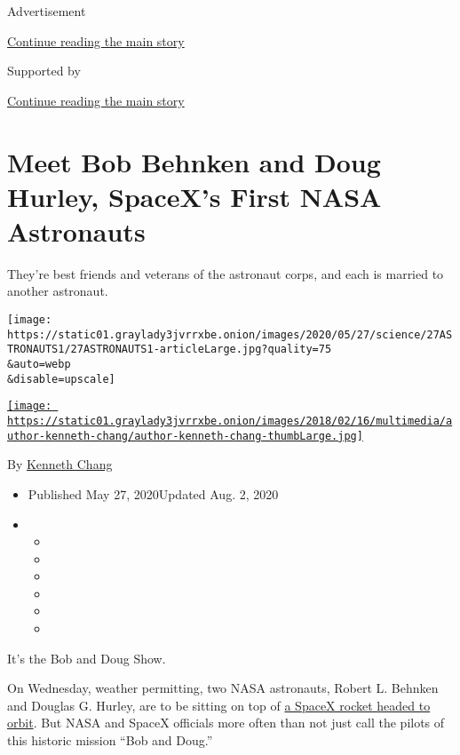 Advertisement

\protect\hyperlink{after-top}{Continue reading the main story}

Supported by

\protect\hyperlink{after-sponsor}{Continue reading the main story}

\hypertarget{meet-bob-behnken-and-doug-hurley-spacexs-first-nasa-astronauts}{%
\section{Meet Bob Behnken and Doug Hurley, SpaceX's First NASA
Astronauts}\label{meet-bob-behnken-and-doug-hurley-spacexs-first-nasa-astronauts}}

They're best friends and veterans of the astronaut corps, and each is
married to another astronaut.

\texttt{[image: https://static01.graylady3jvrrxbe.onion/images/2020/05/27/science/27ASTRONAUTS1/27ASTRONAUTS1-articleLarge.jpg?quality=75\\\&auto=webp\\\&disable=upscale]}

\href{https://www.nytimes3xbfgragh.onion/by/kenneth-chang}{\texttt{[image: https://static01.graylady3jvrrxbe.onion/images/2018/02/16/multimedia/author-kenneth-chang/author-kenneth-chang-thumbLarge.jpg]}}

By \href{https://www.nytimes3xbfgragh.onion/by/kenneth-chang}{Kenneth
Chang}

\begin{itemize}
\item
  Published May 27, 2020Updated Aug. 2, 2020
\item
  \begin{itemize}
  \item
  \item
  \item
  \item
  \item
  \item
  \end{itemize}
\end{itemize}

It's the Bob and Doug Show.

On Wednesday, weather permitting, two NASA astronauts, Robert L. Behnken
and Douglas G. Hurley, are to be sitting on top of
\href{https://www.nytimes3xbfgragh.onion/2020/05/26/science/spacex-launch-nasa.html}{a
SpaceX rocket headed to orbit}. But NASA and SpaceX officials more often
than not just call the pilots of this historic mission ``Bob and Doug.''

